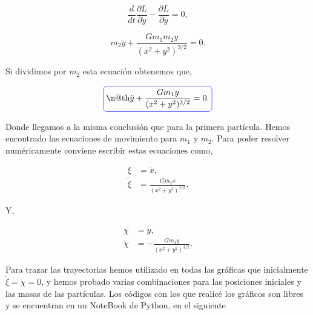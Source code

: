 \documentclass[a4paper,10pt]{article}
\makeatletter
\numberwithin{equation}{section}
\newcommand*{\boxcolor}{blue}
\renewcommand{\boxed}[1]{\textcolor{\boxcolor}{%
\tikz[baseline={([yshift=-1ex]current bounding box.center)}] \node [rectangle, minimum width=1ex,rounded corners,draw] {\normalcolor\m@th$\displaystyle#1$};}}
\makeatother
\begin{document}
\begin{equation}
 \frac{d}{dt} \frac{\partial L}{\partial \dot{y}} - \frac{\partial L}{\partial y} = 0,
\end{equation}

\begin{equation}
 m_2\ddot{y} + \frac{G m_1 m_2 y}{(x^2+y^2)^{3/2}} = 0.
\end{equation}

Si dividimos por $m_2$ esta ecuación obtenemos que,

\begin{equation}
 \boxed{\ddot{y} + \frac{G m_1 y}{(x^2+y^2)^{3/2}} = 0.}
\end{equation}

Donde llegamos a la misma conclusión que para la primera partícula. 
Hemos encontrado las ecuaciones de movimiento para $m_1$ y $m_2$. 
Para poder resolver numéricamente conviene escribir estas ecuaciones como,

\begin{align}
 \xi &= \dot{x}, \\ 
 \dot{\xi} &= \frac{G m_2 x }{(x^2+y^2)^{3/2}}.
\end{align}

Y,

\begin{align}
 \chi &= \dot{y}, \\
 \dot{\chi} &= - \frac{G m_1 y }{(x^2+y^2)^{3/2}}.
\end{align}

Para trazar las trayectorias hemos utilizado en todas las
gráficas que inicialmente $\dot{\xi} = \dot{\chi} = 0$, y hemos probado varias 
combinaciones para las posiciones iniciales y las masas de las partículas. Los códigos 
con los que realicé los gráficos son libres y se encuentran en un NoteBook de Python,
en el siguiente \href{https://github.com/FavioVazquez/MecanicaClasica-PCF/blob/master/Tarea4/Problema\%201.ipynb}{\color{blue}{.::link::.}}
\end{document}
